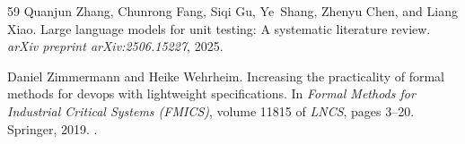 \documentclass[11pt]{article}
\begin{document}
\begin{thebibliography}{59}
Quanjun Zhang, Chunrong Fang, Siqi Gu, Ye~Shang, Zhenyu Chen, and Liang Xiao.
\newblock Large language models for unit testing: A systematic literature
  review.
\newblock \emph{arXiv preprint arXiv:2506.15227}, 2025.

Daniel Zimmermann and Heike Wehrheim.
\newblock Increasing the practicality of formal methods for devops with
  lightweight specifications.
\newblock In \emph{Formal Methods for Industrial Critical Systems (FMICS)},
  volume 11815 of \emph{LNCS}, pages 3--20. Springer, 2019.
\newblock {}.

\end{thebibliography}
\end{document}
